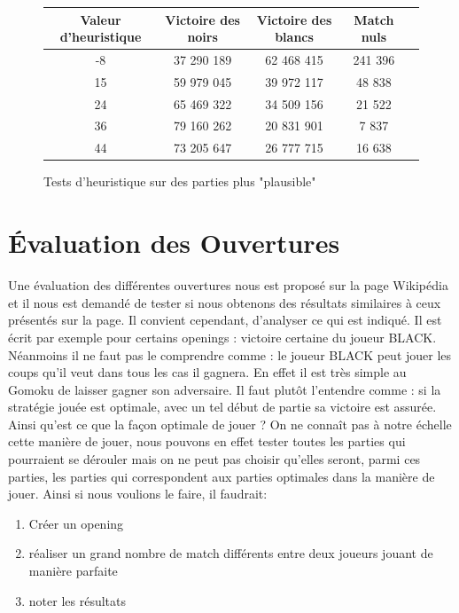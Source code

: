 \documentclass[a4paper,11pt]{article}
\begin{document}
\begin{figure}[h]
    \centering
    \caption{Tests d'heuristique sur des parties plus "plausible"}
    \label{tab4}
    \begin{tabular}{|c|c|c|c|c|}
    \hline
        Valeur d'heuristique & Victoire des noirs & Victoire des blancs & Match nuls\\
        \hline
        -8 & 37 290 189 & 62 468 415 & 241 396 \\
        \hline
        15 & 59 979 045 & 39 972 117 & 48 838 \\
        \hline
        24 & 65 469 322 & 34 509 156 & 21 522 \\
        \hline
        36 & 79 160 262 & 20 831 901 & 7 837\\
        \hline
        44 & 73 205 647 & 26 777 715 & 16 638\\
        \hline
    \end{tabular}
\end{figure}


\section{Évaluation des Ouvertures}

Une évaluation des différentes ouvertures nous est proposé sur la page Wikipédia et il nous est demandé de tester si nous obtenons des résultats similaires à ceux présentés sur la page. Il convient cependant, d'analyser ce qui est indiqué. Il est écrit par exemple pour certains openings : victoire certaine du joueur BLACK. Néanmoins il ne faut pas le comprendre comme : le joueur BLACK peut jouer les coups qu'il veut dans tous les cas il gagnera. En effet il est très simple au Gomoku de laisser gagner son adversaire. Il faut plutôt l'entendre comme : si la stratégie jouée est optimale, avec un tel début de partie sa victoire est assurée. Ainsi qu'est ce que la façon optimale de jouer ? On ne connaît pas à notre échelle cette manière de jouer, nous pouvons en effet tester toutes les parties qui pourraient se dérouler mais on ne peut pas choisir qu'elles seront, parmi ces parties, les parties qui correspondent aux parties optimales dans la manière de jouer. Ainsi si nous voulions le faire, il faudrait:
\begin{enumerate}
    \item Créer un opening
    \item réaliser un grand nombre de match différents entre deux joueurs jouant de manière parfaite
    \item noter les résultats
\end{enumerate}
\end{document}

